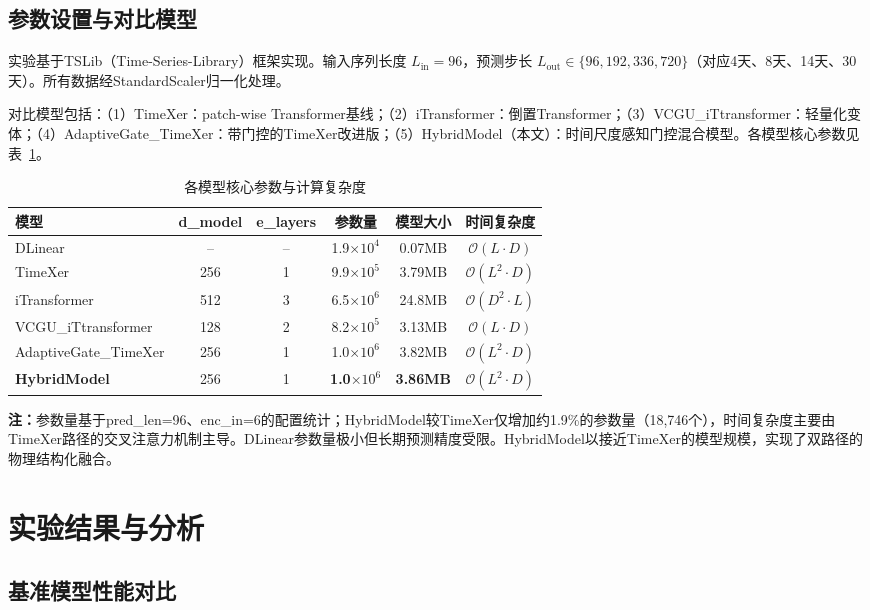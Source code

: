 \documentclass[12pt,a4paper]{article}
\begin{document}
\subsection{参数设置与对比模型}

实验基于TSLib（Time-Series-Library）框架实现。输入序列长度 $L_{\text{in}}=96$，预测步长 $L_{\text{out}} \in \{96, 192, 336, 720\}$（对应4天、8天、14天、30天）。所有数据经StandardScaler归一化处理。

对比模型包括：（1）TimeXer\cite{wang2024timexer}：patch-wise Transformer基线；（2）iTransformer\cite{liu2023itransformer}：倒置Transformer；（3）VCGU\_iTtransformer：轻量化变体；（4）AdaptiveGate\_TimeXer：带门控的TimeXer改进版；（5）HybridModel（本文）：时间尺度感知门控混合模型。各模型核心参数见表~\ref{tab:params}。

\begin{table}[H]
\centering
\caption{各模型核心参数与计算复杂度}
\label{tab:params}
\begin{tabular}{lccccc}
\toprule
模型 & d\_model & e\_layers & 参数量 & 模型大小 & 时间复杂度 \\
\midrule
DLinear & -- & -- & 1.9$\times10^4$ & 0.07MB & $\mathcal{O}(L \cdot D)$ \\
TimeXer & 256 & 1 & 9.9$\times10^5$ & 3.79MB & $\mathcal{O}(L^2 \cdot D)$ \\
iTransformer & 512 & 3 & 6.5$\times10^6$ & 24.8MB & $\mathcal{O}(D^2 \cdot L)$ \\
VCGU\_iTtransformer & 128 & 2 & 8.2$\times10^5$ & 3.13MB & $\mathcal{O}(L \cdot D)$ \\
AdaptiveGate\_TimeXer & 256 & 1 & 1.0$\times10^6$ & 3.82MB & $\mathcal{O}(L^2 \cdot D)$ \\
\textbf{HybridModel} & 256 & 1 & \textbf{1.0$\times10^6$} & \textbf{3.86MB} & $\mathcal{O}(L^2 \cdot D)$ \\
\bottomrule
\end{tabular}
\end{table}

\textbf{注：}参数量基于pred\_len=96、enc\_in=6的配置统计；HybridModel较TimeXer仅增加约1.9\%的参数量（18,746个），时间复杂度主要由TimeXer路径的交叉注意力机制主导。DLinear参数量极小但长期预测精度受限。HybridModel以接近TimeXer的模型规模，实现了双路径的物理结构化融合。

\section{实验结果与分析}

\subsection{基准模型性能对比}
\end{document}
